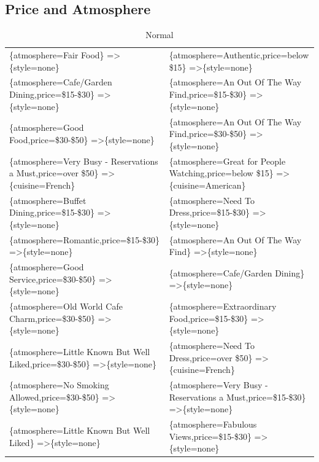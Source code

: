 \documentclass[letterpaper,10pt]{article}
\begin{document}
\begin{appendices}
\subsection*{Price and Atmosphere}
\begin{table}[h]
\caption*{Normal}
\begin{adjustbox}{max width=\textwidth}
\begin{tabular}{ll}
\{atmosphere=Fair Food\} =\textgreater \{style=none\} & \{atmosphere=Authentic,price=below \$15\} =\textgreater \{style=none\} \\ 
\{atmosphere=Cafe/Garden Dining,price=\$15-\$30\} =\textgreater \{style=none\} & \{atmosphere=An Out Of The Way Find,price=\$15-\$30\} =\textgreater \{style=none\} \\ 
\{atmosphere=Good Food,price=\$30-\$50\} =\textgreater \{style=none\} & \{atmosphere=An Out Of The Way Find,price=\$30-\$50\} =\textgreater \{style=none\} \\ 
\{atmosphere=Very Busy - Reservations a Must,price=over \$50\} =\textgreater \{cuisine=French\} & \{atmosphere=Great for People Watching,price=below \$15\} =\textgreater \{cuisine=American\} \\ 
\{atmosphere=Buffet Dining,price=\$15-\$30\} =\textgreater \{style=none\} & \{atmosphere=Need To Dress,price=\$15-\$30\} =\textgreater \{style=none\} \\ 
\{atmosphere=Romantic,price=\$15-\$30\} =\textgreater \{style=none\} & \{atmosphere=An Out Of The Way Find\} =\textgreater \{style=none\} \\ 
\{atmosphere=Good Service,price=\$30-\$50\} =\textgreater \{style=none\} & \{atmosphere=Cafe/Garden Dining\} =\textgreater \{style=none\} \\ 
\{atmosphere=Old World Cafe Charm,price=\$30-\$50\} =\textgreater \{style=none\} & \{atmosphere=Extraordinary Food,price=\$15-\$30\} =\textgreater \{style=none\} \\ 
\{atmosphere=Little Known But Well Liked,price=\$30-\$50\} =\textgreater \{style=none\} & \{atmosphere=Need To Dress,price=over \$50\} =\textgreater \{cuisine=French\} \\ 
\{atmosphere=No Smoking Allowed,price=\$30-\$50\} =\textgreater \{style=none\} & \{atmosphere=Very Busy - Reservations a Must,price=\$15-\$30\} =\textgreater \{style=none\} \\ 
\{atmosphere=Little Known But Well Liked\} =\textgreater \{style=none\} & \{atmosphere=Fabulous Views,price=\$15-\$30\} =\textgreater \{style=none\} \\ 

\end{tabular}
\end{adjustbox}
\end{table}
\end{appendices}
\end{document}
